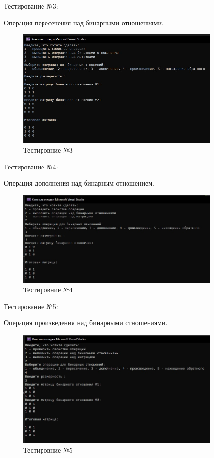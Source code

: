 \documentclass[bachelor, och, labwork]{shiza}
\begin{document}
	Тестирование №3:

Операция пересечения над бинарными отношениями.

	
	\begin{figure}[H]
		\centering
		\includegraphics[width=0.9\textwidth]{test_3}
		\caption{Тестировние №3}
		\label{fig:test_3}
	\end{figure}
	
		Тестирование №4:
	
Операция дополнения над бинарным отношением.
	
	
	\begin{figure}[H]
		\centering
		\includegraphics[width=0.9\textwidth]{test_4}
		\caption{Тестировние №4}
		\label{fig:test_4}
	\end{figure}

	Тестирование №5:

Операция произведения над бинарными отношениями.


\begin{figure}[H]
	\centering
	\includegraphics[width=0.9\textwidth]{test_5}
	\caption{Тестировние №5}
	\label{fig:test_5}
\end{figure}
\end{document}
